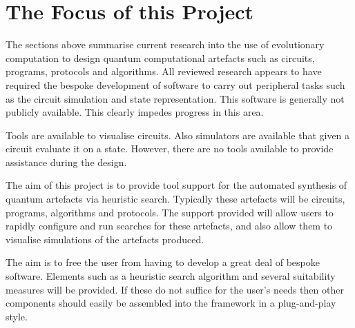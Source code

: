 \section{The Focus of this Project}
\label{sec:focusofproject}
The sections above summarise current research into the use of evolutionary computation to design quantum computational artefacts such as circuits, programs, protocols and algorithms.
All reviewed research appears to have required the bespoke development of software to carry out peripheral tasks such as the circuit simulation and state representation.
This software is generally not publicly available.
This clearly impedes progress in this area.


Tools are available to visualise circuits.
Also simulators are available that given a circuit evaluate it on a state.
However, there are no tools available to provide assistance during the design.

The aim of this project is to provide tool support for the automated synthesis of quantum artefacts via heuristic search.
Typically these artefacts will be circuits, programs, algorithms and protocols.
The support provided will allow users to rapidly configure and run searches for these artefacts, and also allow them to visualise simulations of the artefacts produced.

The aim is to free the user from having to develop a great deal of bespoke software.
Elements such as a heuristic search algorithm and several suitability measures will be provided.
If these do not suffice for the user's needs then other components should easily be assembled into the framework in a plug-and-play style.

